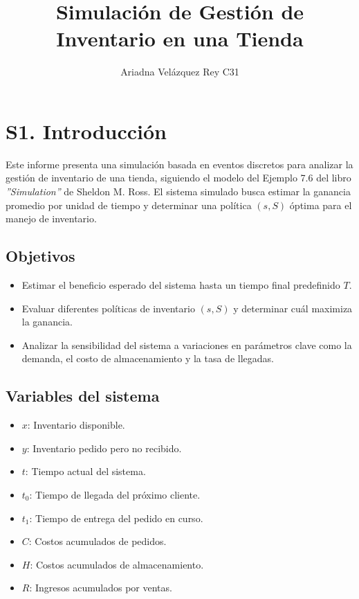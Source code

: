 \documentclass{report}
\title{Simulación de Gestión de Inventario en una Tienda}
\author{Ariadna Velázquez Rey     C31}
\date{ }
\begin{document}
\maketitle

\section*{S1. Introducción}

Este informe presenta una simulación basada en eventos discretos para analizar la gestión de inventario de una tienda, siguiendo el modelo del Ejemplo 7.6 del libro \textit{''Simulation''} de Sheldon M. Ross. El sistema simulado busca estimar la ganancia promedio por unidad de tiempo y determinar una política \((s, S)\) óptima para el manejo de inventario.

\subsection*{Objetivos}

\begin{itemize}
\item Estimar el beneficio esperado del sistema hasta un tiempo final predefinido \(T\).
\item Evaluar diferentes políticas de inventario \((s, S)\) y determinar cuál maximiza la ganancia.
\item Analizar la sensibilidad del sistema a variaciones en parámetros clave como la demanda, el costo de almacenamiento y la tasa de llegadas.
\end{itemize}

\subsection*{Variables del sistema}

\begin{itemize}
\item \(x\): Inventario disponible.
\item \(y\): Inventario pedido pero no recibido.
\item \(t\): Tiempo actual del sistema.
\item \(t_0\): Tiempo de llegada del próximo cliente.
\item \(t_1\): Tiempo de entrega del pedido en curso.
\item \(C\): Costos acumulados de pedidos.
\item \(H\): Costos acumulados de almacenamiento.
\item \(R\): Ingresos acumulados por ventas.
\end{itemize}
\end{document}
